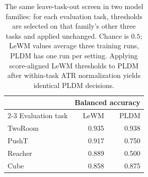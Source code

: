 \begin{table}[t]
\centering
\caption{The same leave-task-out screen in two model families: for each evaluation task, thresholds are selected on that family's other three tasks and applied unchanged. Chance is $0.5$; LeWM values average three training runs, PLDM has one run per setting. Applying score-aligned LeWM thresholds to PLDM after within-task ATR normalization yields identical PLDM decisions.}
\label{tab:pldm-architecture-portability}
\small
\setlength{\tabcolsep}{6pt}
\begin{tabular}{lrr}
\toprule
 & \multicolumn{2}{c}{Balanced accuracy} \\
\cmidrule(lr){2-3}
Evaluation task & LeWM & PLDM \\
\midrule
TwoRoom & 0.935 & 0.938 \\
PushT & 0.917 & 0.750 \\
Reacher & 0.889 & 0.500 \\
Cube & 0.858 & 0.875 \\
\bottomrule
\end{tabular}
\end{table}

